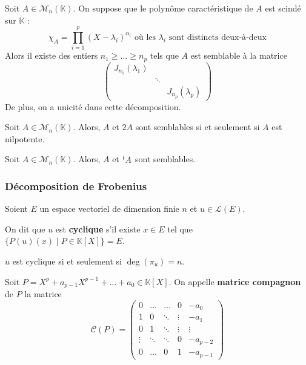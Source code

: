   \begin{theorem}
    Soit $A \in \mathcal{M}_n(\mathbb{K})$. On suppose que le polynôme caractéristique de $A$ est scindé sur $\mathbb{K}$ :
    \[ \chi_A = \prod_{i=1}^p (X - \lambda_i)^{\alpha_i} \text{ où les } \lambda_i \text{ sont distincts deux-à-deux} \]
    Alors il existe des entiers $n_1 \geq \dots \geq n_p$ tels que $A$ est semblable à la matrice
    \[ \begin{pmatrix} J_{n_1}(\lambda_1) & & \\ & \ddots & \\ & & J_{n_p}(\lambda_p) \end{pmatrix} \]
    De plus, on a unicité dans cette décomposition.
  \end{theorem}
  
  \begin{application}
    Soit $A \in \mathcal{M}_n(\mathbb{K})$. Alors, $A$ et $2A$ sont semblables si et seulement si $A$ est nilpotente.
  \end{application}
  
  \begin{application}
    Soit $A \in \mathcal{M}_n(\mathbb{K})$. Alors, $A$ et $\mathstrut ^t A$ sont semblables.
  \end{application}
  
  \subsubsection{Décomposition de Frobenius}
  
  
  Soient $E$ un espace vectoriel de dimension finie $n$ et $u \in \mathcal{L}(E)$.
  
  \begin{definition}
    \label{154-1}
    On dit que $u$ est \textbf{cyclique} s'il existe $x \in E$ tel que $\{ P(u)(x) \mid P \in \mathbb{K}[X] \} = E$.
  \end{definition}
  
  \begin{proposition}
    $u$ est cyclique si et seulement si $\deg(\pi_u) = n$.
  \end{proposition}
  
  \begin{definition}
    Soit $P = X^p + a_{p-1} X^{p-1} + \dots + a_0 \in \mathbb{K}[X]$. On appelle \textbf{matrice compagnon} de $P$ la matrice
    \[ \mathcal{C}(P) = \begin{pmatrix} 0 & \dots & \dots & 0 & -a_0 \\ 1 & 0 & \ddots & \vdots & -a_1 \\ 0 & 1 & \ddots & \vdots & \vdots \\ \vdots & \ddots & \ddots & 0 & -a_{p-2} \\ 0 & \dots & 0 & 1 & -a_{p-1} \end{pmatrix} \]
  \end{definition}
  
